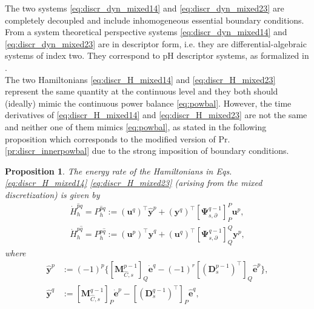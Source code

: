 \documentclass{elsarticle}
\newtheorem{proposition}{Proposition}
\newcommand*{\dual}[1]{\ensuremath{\widehat{#1}}}
\begin{document}
The two systems \eqref{eq:discr_dyn_mixed14} and \eqref{eq:discr_dyn_mixed23} are completely decoupled and include inhomogeneous essential boundary conditions. From a system theoretical perspective systems \eqref{eq:discr_dyn_mixed14} and \eqref{eq:discr_dyn_mixed23} are in descriptor form, i.e. they are differential-algebraic systems of index two. They correspond to pH descriptor systems, as formalized in \cite{beattie2018pHDAE}. \\

The two Hamiltonians \eqref{eq:discr_H_mixed14} and \eqref{eq:discr_H_mixed23} represent the same quantity at the continuous level and they both should (ideally) mimic the continuous power balance \eqref{eq:powbal}. However, the time derivatives of \eqref{eq:discr_H_mixed14} and \eqref{eq:discr_H_mixed23} are not the same and neither one of them mimics \eqref{eq:powbal}, as stated in the following proposition which corresponds to the modified version of Pr. \ref{pr:discr_innerpowbal} due to the strong imposition of boundary conditions.

\begin{proposition}\label{pr:discr_energyrate}
The energy rate of the Hamiltonians in Eqs. \eqref{eq:discr_H_mixed14} \eqref{eq:discr_H_mixed23} (arising from the mixed discretization) is given by  
\begin{equation}
\begin{aligned}
    \dot{H}_h^{\dual{p}q} = P_h^{\dual{p}q} := (\mathbf{u}^q)^\top \dual{\mathbf{y}}^p + (\mathbf{y}^q)^\top[\mathbf{\Psi}^{q-1}_{s, \partial}]_{P}^{P} \mathbf{u}^p, \\
    \dot{H}_h^{p\dual{q}} = P_h^{p\dual{q}} := (\mathbf{u}^p)^\top \dual{\mathbf{y}}^q + (\mathbf{u}^q)^\top[\mathbf{\Psi}^{q-1}_{s, \partial}]_{Q}^{Q} \mathbf{y}^p,
\end{aligned} 
\end{equation}
where
\begin{align}
    \dual{\mathbf{y}}^p &:= (-1)^p \{[\mathbf{M}^{p-1}_{\dual{C}, s}]_{Q} \dot{\mathbf{e}}^q  -(-1)^r[(\mathbf{D}_{s}^{p-1})^\top]_{Q} \dual{\mathbf{e}}^p\},  \label{eq:dual_yp} \\
    \dual{\mathbf{y}}^q &:= [\mathbf{M}^{q-1}_{\dual{C}, s}]_{P} \dot{\mathbf{e}}^p  -[(\mathbf{D}_{s}^{q-1})^\top]_{P} \dual{\mathbf{e}}^q, \label{eq:dual_yq}
\end{align}
\end{proposition}
\end{document}
